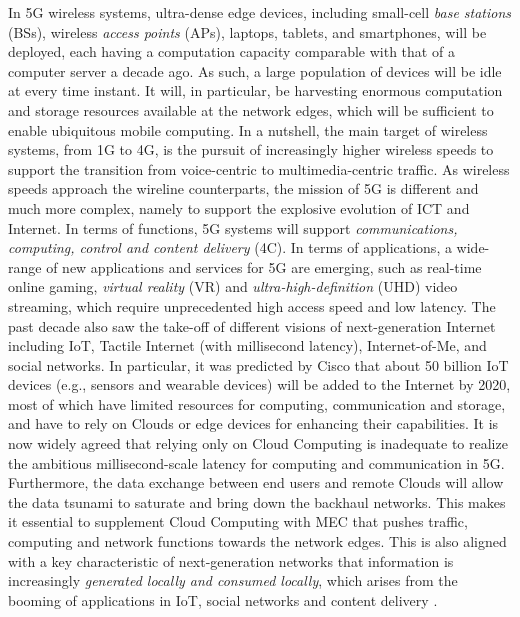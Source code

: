 \documentclass[journal]{IEEEtran}
\begin{document}
In 5G wireless systems, ultra-dense edge devices, including  small-cell \emph{base stations} (BSs), wireless \emph{access points} (APs), laptops, tablets, and smartphones, will be deployed, each having a computation capacity comparable with that of a computer server a decade ago. As such, a large population of devices will be idle at every time instant. It will, in particular, be harvesting enormous computation and storage resources available at the network edges, which will be sufficient to enable ubiquitous mobile computing.
In a nutshell, the main target of wireless systems, from 1G to 4G, is the pursuit of increasingly higher  wireless speeds  to support the transition from voice-centric to multimedia-centric traffic. As wireless speeds approach the wireline counterparts, the mission of 5G is different and much more complex, namely to support the explosive evolution of ICT and Internet. In terms of functions, 5G systems will support \emph{communications, computing, control and content delivery} (4C). In terms of applications, a wide-range of new applications and services for 5G are emerging, such as real-time online gaming, \emph{virtual reality} (VR) and \emph{ultra-high-definition} (UHD) video streaming, which require unprecedented high access speed and low latency. The past decade also saw the take-off of different visions of next-generation Internet including IoT, Tactile Internet (with millisecond latency), Internet-of-Me, and social networks. In particular, it was  predicted by Cisco that about 50 billion IoT devices  (e.g., sensors and wearable devices) will be added to the  Internet by 2020, most of which have limited resources  for  computing, communication and storage, and have to rely on Clouds or edge devices for enhancing their capabilities\cite{evansinternet}.  It is now widely agreed that relying only on Cloud Computing is inadequate to realize the ambitious millisecond-scale latency for computing and communication in 5G. Furthermore, the data exchange between end users and remote Clouds will allow the data tsunami to saturate and bring down  the backhaul networks. This makes it essential to supplement Cloud Computing with MEC that pushes traffic, computing and network functions towards the network edges. This is also aligned with a key characteristic of next-generation networks that information is increasingly \emph{generated locally and consumed locally}, which arises from the booming of  applications in IoT, social networks and content delivery \cite{chiangfog}.
\end{document}
